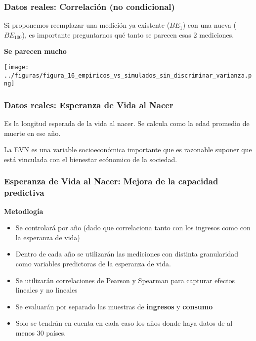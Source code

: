 \documentclass[10pt,mathserif]{beamer}%
\begin{document}
\begin{frame}
    \frametitle{Datos reales: Correlación (no condicional)}
    Si proponemos reemplazar una medición ya existente ($BE_1$) con una nueva ($BE_{100}$), es importante preguntarnos qué tanto se parecen esas 2 mediciones.
    
    \pause

    \textbf{Se parecen mucho}

    \texttt{[image: ../figuras/figura\_16\_empiricos\_vs\_simulados\_sin\_discriminar\_varianza.png]} %
\end{frame}

\begin{frame}
    \frametitle{Datos reales: Esperanza de Vida al Nacer}
    \begin{definition}
        Es la longitud esperada de la vida al nacer. 
        Se calcula como la edad promedio de muerte en ese año.
    \end{definition}

    La EVN es una variable socioeconómica importante que es razonable suponer que está vinculada con el bienestar ecónomico de la sociedad.
\end{frame}

\begin{frame}
    \frametitle{Esperanza de Vida al Nacer: Mejora de la capacidad predictiva}
    \textbf{Metodlogía}
    \begin{itemize}
        \item Se controlará por año (dado que correlaciona tanto con los ingresos como con la esperanza de vida)
        \item Dentro de cada año se utilizarán las mediciones con distinta granularidad como variables predictoras de la esperanza de vida.
        \item Se utilizarán correlaciones de Pearson y Spearman para capturar efectos lineales y no lineales
        \item Se evaluarán por separado las muestras de \textbf{ingresos} y \textbf{consumo}
        \item Solo se tendrán en cuenta en cada caso los años donde haya datos de al menos 30 países.
    \end{itemize}
\end{frame}
\end{document}
